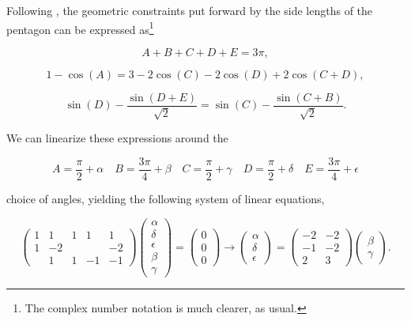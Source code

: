 			Following \cite{PentaTrig}, the geometric constraints put forward by the side lengths of the pentagon can be expressed as\footnote{The complex number notation is much clearer, as usual.}
			
			\begin{equation}
				A+B+C+D+E = 3\pi,
				\label{eq:anglesum}
			\end{equation}
			
			\begin{equation}
				1 - \cos(A) = 3 - 2 \cos(C) - 2 \cos(D) + 2 \cos(C+D),
				\label{eq:cosinelaw}
			\end{equation}
			
			\begin{equation}
				\sin(D) - \frac{\sin(D+E)}{\sqrt{2}} = \sin(C) - \frac{\sin(C+B)}{\sqrt{2}}.
				\label{eq:sinelaw}
			\end{equation}
			
			We can linearize these expressions around the
			
			\begin{equation}
				A = \frac{\pi}{2} + \alpha\quad B = \frac{3\pi}{4} + \beta\quad C = \frac{\pi}{2} + \gamma\quad D = \frac{\pi}{2} + \delta\quad E = \frac{3\pi}{4} + \epsilon
				\label{eq:restangles}
			\end{equation}
			
			choice of angles, yielding the following system of linear equations,
			
			\begin{equation}
				\begin{pmatrix}
					1 & 1 & 1 & 1 & 1\\
					1 & -2 &  &  & -2\\
					 & 1 & 1 & -1 & -1
				\end{pmatrix}
				\begin{pmatrix}
					\alpha\\
					\delta\\
					\epsilon\\
					\beta\\
					\gamma
				\end{pmatrix}
				=\begin{pmatrix}
					0\\
					0\\
					0
				\end{pmatrix}
				\rightarrow
				\begin{pmatrix}
					\alpha\\
					\delta\\
					\epsilon
				\end{pmatrix}
				=
				\begin{pmatrix}
					-2 & -2\\
					-1 & -2\\
					 2 & 3
				\end{pmatrix}
				\begin{pmatrix}
					\beta\\
					\gamma
				\end{pmatrix}.
				\label{eq:system}
			\end{equation}
			
